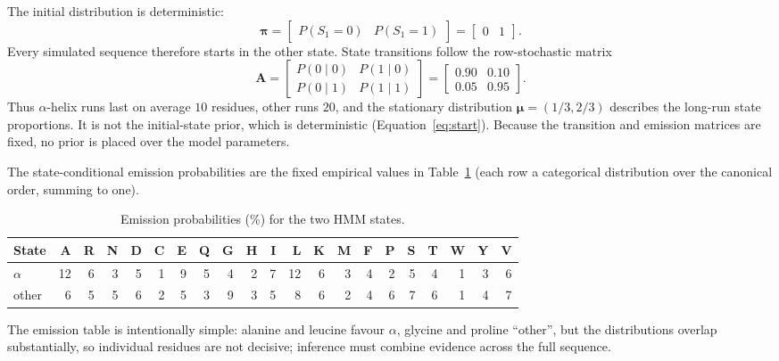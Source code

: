 \documentclass[12pt]{article}
\begin{document}
The initial distribution is deterministic:
\begin{equation}
\boldsymbol{\pi}
=\begin{bmatrix}P(S_1=0)&P(S_1=1)\end{bmatrix}
=\begin{bmatrix}0&1\end{bmatrix}.
\label{eq:start}
\end{equation}
Every simulated sequence therefore starts in the other state. State transitions follow
the row-stochastic matrix
\begin{equation}
\mathbf{A}=
\begin{bmatrix}
P(0\mid0)&P(1\mid0)\\
P(0\mid1)&P(1\mid1)
\end{bmatrix}
=
\begin{bmatrix}
0.90&0.10\\
0.05&0.95
\end{bmatrix}.
\label{eq:transition}
\end{equation}
Thus $\alpha$-helix runs last on average $10$ residues, other runs $20$,
and the stationary distribution $\boldsymbol{\mu}=(1/3,2/3)$ describes the
long-run state proportions. It is not the initial-state prior, which is
deterministic (Equation~\ref{eq:start}). Because the transition and emission
matrices are fixed, no prior is placed over the model parameters.

The state-conditional emission probabilities are the fixed empirical values in
Table~\ref{tab:emissions} (each row a categorical distribution over the canonical
order, summing to one).

\begin{table}[ht]
    \centering
    \caption{Emission probabilities (\%) for the two HMM states.}
    \label{tab:emissions}
    \footnotesize
    \setlength{\tabcolsep}{2.4pt}
    \begin{tabular}{l|rrrrrrrrrrrrrrrrrrrr}
        \hline
        State & A & R & N & D & C & E & Q & G & H & I & L & K & M & F & P & S & T & W & Y & V \\
        \hline
        $\alpha$ & 12 & 6 & 3 & 5 & 1 & 9 & 5 & 4 & 2 & 7 & 12 & 6 & 3 & 4 & 2 & 5 & 4 & 1 & 3 & 6 \\
        other & 6 & 5 & 5 & 6 & 2 & 5 & 3 & 9 & 3 & 5 & 8 & 6 & 2 & 4 & 6 & 7 & 6 & 1 & 4 & 7 \\
        \hline
    \end{tabular}
\end{table}

The emission table is intentionally simple: alanine and leucine favour
$\alpha$, glycine and proline ``other'', but the distributions overlap
substantially, so individual residues are not decisive; inference must combine
evidence across the full sequence.
\end{document}
